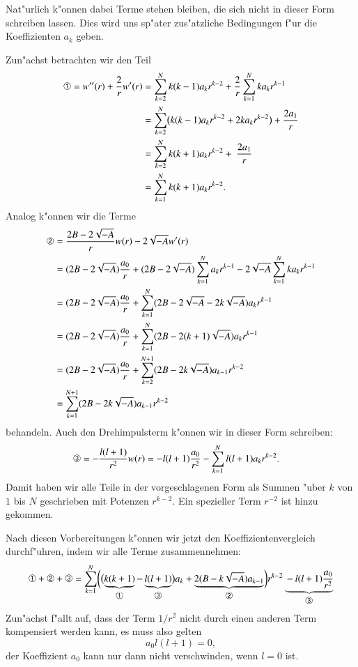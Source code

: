 Nat"urlich k"onnen dabei Terme stehen bleiben, die
sich nicht in dieser Form schreiben lassen.
Dies wird uns sp"ater zus"atzliche Bedingungen f"ur die Koeffizienten $a_k$
geben.

Zun"achst betrachten wir den Teil
\begin{align*}
\text{\ding{192}}=
w''(r)+\frac2{r}w'(r)
&=
\sum_{k=2}^N k(k-1)a_kr^{k-2} + \frac{2}{r}\sum_{k=1}^Nka_kr^{k-1}
\\
&=
\sum_{k=2}^N\bigl(k(k-1)a_kr^{k-2} + 2ka_kr^{k-2}\bigr) + \frac{2a_1}{r}
\\
&=
\sum_{k=2}^Nk(k+1)a_kr^{k-2} + \frac{2a_1}r
\\
&=
\sum_{k=1}^Nk(k+1)a_kr^{k-2}.
\end{align*}
Analog k"onnen wir die Terme 
\begin{align*}
\text{\ding{193}}&=
\frac{2B-2\sqrt{-A}}{r}w(r)-2\sqrt{-A}w'(r)
\\
&=
(2B-2\sqrt{-A})\frac{a_0}{r}
+
(2B-2\sqrt{-A})\sum_{k=1}^Na_kr^{k-1}
-2\sqrt{-A}\sum_{k=1}^Nka_kr^{k-1}
\\
&=
(2B-2\sqrt{-A})\frac{a_0}{r}
+
\sum_{k=1}^N
(2B-2\sqrt{-A}
-2k\sqrt{-A})a_kr^{k-1}
\\
&=
(2B-2\sqrt{-A})\frac{a_0}{r}
+
\sum_{k=1}^N
(2B-2(k+1)\sqrt{-A})a_kr^{k-1}
\\
&=
(2B-2\sqrt{-A})\frac{a_0}{r}
+
\sum_{k=2}^{N+1}
(2B-2k\sqrt{-A})a_{k-1}r^{k-2}
\\
&=
\sum_{k=1}^{N+1}
(2B-2k\sqrt{-A})a_{k-1}r^{k-2}
\end{align*}
behandeln.
Auch den Drehimpulsterm k"onnen wir in dieser Form schreiben:
\begin{align*}
\text{\ding{194}}=
-\frac{l(l+1)}{r^2}w(r)
&=
-l(l+1)\frac{a_0}{r^2}
-
\sum_{k=1}^Nl(l+1)a_kr^{k-2}.
\end{align*}
Damit haben wir alle Teile in der vorgeschlagenen Form als Summen
"uber $k$ von $1$ bis $N$ geschrieben mit Potenzen $r^{k-2}$.
Ein spezieller Term $r^{-2}$ ist hinzu gekommen.

Nach diesen Vorbereitungen k"onnen wir jetzt den Koeffizientenvergleich
durchf"uhren, indem wir alle Terme zusammennehmen:
\begin{equation}
\text{\ding{192}}
+
\text{\ding{193}}
+
\text{\ding{194}}
=
\sum_{k=1}^{N}
\biggl(
\bigl(
\underbrace{
k(k+1)
}_{\text{\normalsize\ding{192}}}
-\underbrace{
l(l+1)
}_{\text{\normalsize\ding{194}}}
\bigr)a_k
+
\underbrace{
2(B-k\sqrt{-A})a_{k-1}
}_{\text{\normalsize\ding{193}}}
\biggr)r^{k-2}
\underbrace{
\mathstrut
-l(l+1)\frac{a_0}{r^2}
}_{\text{\normalsize\ding{194}}}
\label{skript:wkoeffizientenvergleich}
\end{equation}
Zun"achst f"allt auf, dass der Term $1/r^2$ nicht durch einen anderen
Term kompensiert werden kann, es muss also gelten
\[
a_0l(l+1)=0,
\]
der Koeffizient $a_0$ kann nur dann nicht verschwinden, wenn $l=0$ ist.

